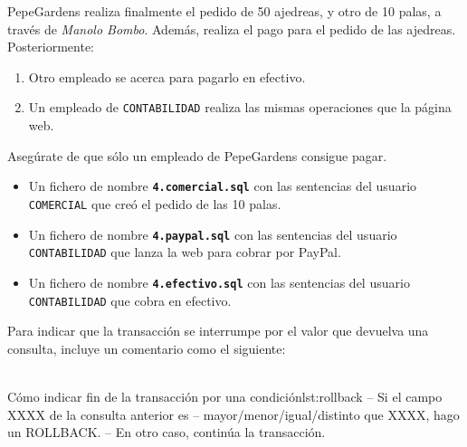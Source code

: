 \newpage

\begin{homeworkProblem}
  PepeGardens realiza finalmente el pedido de 50 ajedreas, y otro de 10 palas, a través
  de \textit{Manolo Bombo}. Además, realiza el pago para el pedido de las ajedreas. Posteriormente:

  {

    \begin{enumerate}
    \item Otro empleado se acerca para pagarlo en efectivo.
    \item Un empleado de \texttt{CONTABILIDAD} realiza las mismas operaciones que la página web.
    \end{enumerate}
  }
  Asegúrate de que sólo un empleado de PepeGardens consigue pagar.
  \begin{Aviso}
    \begin{itemize}
    \item Un fichero de nombre \texttt{\textbf{4.comercial.sql}} con las sentencias del usuario \texttt{COMERCIAL} que creó el pedido de las 10 palas.
    \item Un fichero de nombre \texttt{\textbf{4.paypal.sql}}  con las sentencias del usuario \texttt{CONTABILIDAD} que lanza la web para cobrar por PayPal.
    \item Un fichero de nombre \texttt{\textbf{4.efectivo.sql}}  con las sentencias del usuario \texttt{CONTABILIDAD} que cobra en efectivo.
    \end{itemize}

    Para indicar que la transacción se interrumpe por el valor que devuelva una consulta, incluye un comentario como el siguiente:
    \\
    \\
\begin{listadosql}{Cómo indicar fin de la transacción por una condición}{lst:rollback}
-- Si el campo XXXX de la consulta anterior es
-- mayor/menor/igual/distinto que XXXX, hago un ROLLBACK.
-- En otro caso, continúa la transacción.
\end{listadosql}
    

  \end{Aviso}

\end{homeworkProblem}

